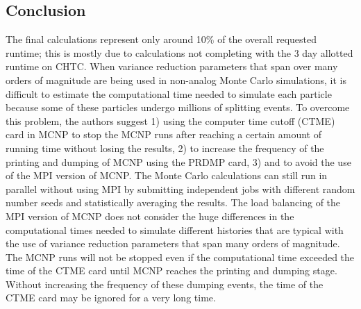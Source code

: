 \documentclass[12pt]{article}
\begin{document}
\subsection{Conclusion}
The final calculations represent only around 10\% of the overall requested runtime; this is mostly due to calculations not completing with the 3 day allotted runtime on CHTC. When variance reduction parameters that span over many orders of magnitude are being used in non-analog Monte Carlo simulations, it is difficult to estimate the computational time needed to simulate each particle because some of these particles undergo millions of splitting events. To overcome this problem, the authors suggest 1) using the computer time cutoff (CTME) card in MCNP to stop the MCNP runs after reaching a certain amount of running time without losing the results, 2) to increase the frequency of the printing and dumping of MCNP using the PRDMP card, 3) and to avoid the use of the MPI version of MCNP. The Monte Carlo calculations can still run in parallel without using MPI by submitting independent jobs with different random number seeds and statistically averaging the results. The load balancing of the MPI version of MCNP does not consider the huge differences in the computational times needed to simulate different histories that are typical with the use of variance reduction parameters that span many orders of magnitude. The MCNP runs will not be stopped even if the computational time exceeded the time of the CTME card until MCNP reaches the printing and dumping stage. Without increasing the frequency of these dumping events, the time of the CTME card may be ignored for a very long time.
\\
\\
\end{document}
